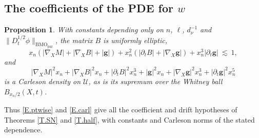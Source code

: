 \documentclass[12pt,leqno]{amsart}
\numberwithin{equation}{section}
\newcommand{\abs}[1]{\left\vert#1\right\vert}
\newcommand{\br}[1]{\left(#1\right)}
\newcommand{\pd}{\partial}
\newcommand{\dhalf}{D_t^{1/2}}
\newcommand{\BMOpar}{\mathrm{BMO}_{\mathrm{par}}}
\newcommand{\Uc}{\mathcal U}
\theoremstyle{plain}
\newtheorem{proposition}[equation]{Proposition}
\theoremstyle{remark}
\begin{document}
\subsection{The coefficients of the PDE for $w$}\label{ss.coeff}

\begin{proposition}\label{P.coeff}
With constants depending only on $n$, $\ell$, $d_\nu^{-1}$ and
$\|\dhalf\phi\|_{\BMOpar}$, the matrix $B$ is uniformly elliptic,
\begin{equation}\label{E.ptwise}
  x_n\br{\abs{\nabla_XM}+\abs{\nabla_XB}+\abs{\mathbf g}}
  +x_n^2\br{\abs{\pd_tB}+\abs{\nabla_X\mathbf g}}
  +x_n^3\abs{\pd_t\mathbf g}\ \lesssim\ 1 ,
\end{equation}
and
\begin{equation}\label{E.carl}
  \abs{\nabla_XM}^2x_n+\abs{\nabla_XB}^2x_n
  +\abs{\pd_tB}^2x_n^3+\abs{\mathbf g}^2x_n
  +\abs{\nabla_X\mathbf g}^2x_n^3
  +\abs{\pd_t\mathbf g}^2x_n^5
\end{equation}
is a Carleson density on $\Uc$, as is its supremum over the Whitney ball
$B_{x_n/2}(X,t)$.
\end{proposition}

\noindent Thus \eqref{E.ptwise} and \eqref{E.carl} give all the coefficient
and drift hypotheses of Theorems \ref{T.SN} and \ref{T.half}, with constants
and Carleson norms of the stated dependence.
\end{document}
